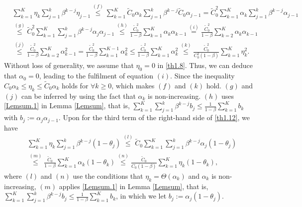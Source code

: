 \documentclass[twoside,11pt]{article}
\begin{document}
\begin{equation}\label{th1.10}
   	\begin{aligned}
   	&\sum_{k=1}^{K}\eta_k\sum_{j=1}^{k}{\beta}^{k-j} \eta_{j-1}
   	\overset{(f)}{\le}\sum_{k=1}^{K}\tilde{C}_0 \alpha_k\sum_{j=1}^{k}{\beta}^{k-j} \tilde{C}_0 \alpha_{j-1}
   	=\tilde{C}_0^2\sum_{k=1}^{K}\alpha_k\sum_{j=1}^{k}{\beta}^{k-j} \alpha_{j-1}\\
   	&\overset{(g)}{\le}
   	\tilde{C}_0^2 \sum_{k=1}^{K}\sum_{j=1}^{k}{\beta}^{k-j} \alpha_j \alpha_{j-1}
   	\overset{(h)}{\le}\frac{\tilde{C}_0^2}{1-{\beta}}\sum_{k=1}^{K}\alpha_k \alpha_{k-1}
   	\overset{(i)}{=}\frac{\tilde{C}_0^2}{1-{\beta}}\sum_{k=2}^{K}\alpha_k \alpha_{k-1}\\
   	&\overset{(j)}{\le}
   	\frac{\tilde{C}_0^2}{1-{\beta}}\sum_{k=2}^{K}\alpha_{k-1}^2
   	=\frac{\tilde{C}_0^2}{1-{\beta}}\sum_{k=1}^{K-1}\alpha_{k}^2 
   	\le\frac{\tilde{C}_0^2}{1-{\beta}} \sum_{k=1}^{K} \alpha_{k}^2
   	\overset{(k)}{\le}\frac{\tilde{C}_0^2}{C_0^2(1-{\beta})}\sum_{k=1}^{K} \eta_{k}^2.
   	\end{aligned}
\end{equation}
Without loss of generality, we assume that $\eta_0=0$ in \eqref{th1.8}. Thus, we can deduce that $\alpha_0=0$, leading to the fulfilment of equation 
$(i)$. Since the inequality $C_0\alpha_{k}\le\eta_{k}\le \tilde{C}_0 \alpha_k$ holds for $\forall k\ge 0$, which makes  $(f)$ and $(k)$ hold. $(g)$ and $(j)$ can be inferred by using the fact that $\alpha_k$ is non-increasing. $(h)$ uses \eqref{Lemsum.1} in Lemma \ref{Lemsum},  that is,  $\sum_{k=1}^{K}\sum_{j=1}^{k}{\beta}^{k-j}b_j\le\frac{1}{1-{\beta}}\sum_{k=1}^{K}b_k$ with $b_j:=\alpha_j \alpha_{j-1}$. Upon for  the third term of the right-hand side of \eqref{th1.12}, we have
\begin{equation}\label{th1.11}
   	\begin{aligned}
   	&\sum_{k=1}^{K}\eta_k\sum_{j=1}^{k}{\beta}^{k-j}{(1-\theta_j)}
   	\overset{(l)}{\le}\tilde{C}_0\sum_{k=1}^{K}\sum_{j=1}^{k}{\beta}^{k-j}\alpha_j{(1-\theta_j)}\\
   	&\overset{(m)}{\le}
   	\frac{\tilde{C}_0 }{1-\beta}\sum_{k=1}^{K}\alpha_k{(1-\theta_k)}
   	\overset{(n)}{\le}\frac{\tilde{C}_0 }{C_0(1-{\beta})}\sum_{k=1}^{K}\eta_k{(1-\theta_k)},
   	\end{aligned}
\end{equation}
where $(l)$ and $(n)$ use the conditions that $\eta_{k}=\Theta(\alpha_{k})$ and $\alpha_k$ is non-increasing, $(m)$ applies \eqref{Lemsum.1} in Lemma \ref{Lemsum},  that is,   $\sum_{k=1}^{K}\sum_{j=1}^{k}{\beta}^{k-j}b_j\le\frac{1}{1-{\beta}}\sum_{k=1}^{K}b_k$, in which we let $b_j:=\alpha_j{(1-\theta_j)}$.
\end{document}
